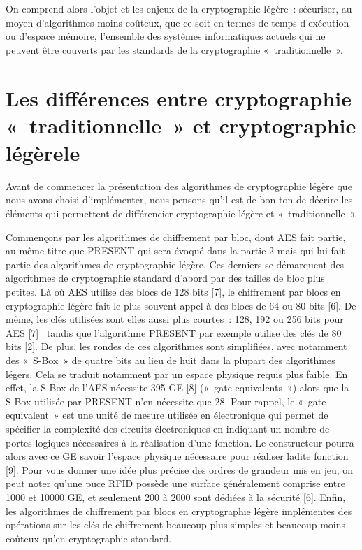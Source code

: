 	On comprend alors l’objet et les enjeux de la cryptographie légère : sécuriser, au moyen d’algorithmes moins coûteux, que ce soit en termes de temps d’exécution ou d’espace mémoire,
	l’ensemble des systèmes informatiques actuels qui ne peuvent être couverts par les standards de la cryptographie « traditionnelle ». 

	\section{Les différences entre cryptographie « traditionnelle » et cryptographie légèrele}
	Avant de commencer la présentation des algorithmes de cryptographie légère que nous avons choisi d’implémenter,
	nous pensons qu’il est de bon ton de décrire les éléments qui permettent de différencier cryptographie légère et « traditionnelle ».

	Commençons par les algorithmes de chiffrement par bloc, dont AES fait partie,
	au même titre que PRESENT qui sera évoqué dans la partie 2 mais qui lui fait partie des algorithmes de cryptographie légère.
	Ces derniers se démarquent des algorithmes de cryptographie standard d’abord par des tailles de bloc plus petites. Là où AES utilise des blocs de 128 bits [7],
	le chiffrement par blocs en cryptographie légère fait le plus souvent appel à des blocs de 64 ou 80 bits [6].
	De même, les clés utilisées sont elles aussi plus courtes : 128, 192 ou 256 bits pour AES [7]  tandis que l’algorithme PRESENT par exemple utilise des clés de 80 bits [2].
	De plus, les rondes de ces algorithmes sont simplifiées, avec notamment des « S-Box » de quatre bits au lieu de huit dans la plupart des algorithmes légers.
	Cela se traduit notamment par un espace physique requis plus faible.	
	En effet, la S-Box de l’AES nécessite 395 GE [8] (« gate equivalents ») alors que la S-Box utilisée par PRESENT n’en nécessite que 28.
	Pour rappel, le « gate equivalent » est une unité de mesure utilisée en électronique qui permet de spécifier la complexité des circuits électroniques en indiquant un nombre de portes logiques nécessaires à la réalisation d’une fonction.
	Le constructeur pourra alors avec ce GE savoir l’espace physique nécessaire pour réaliser ladite fonction [9].
	Pour vous donner une idée plus précise des ordres de grandeur mis en jeu, on peut noter qu’une puce RFID possède une surface généralement comprise entre 1000 et 10000 GE,
	et seulement 200 à 2000 sont dédiées à la sécurité [6]. Enfin, les algorithmes de chiffrement par blocs en cryptographie légère implémentes des opérations sur les clés de chiffrement beaucoup plus simples et beaucoup moins coûteux qu’en cryptographie standard.

